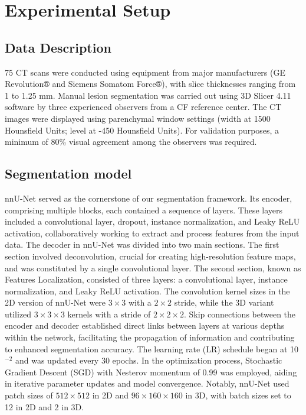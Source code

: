 \documentclass{article}
\begin{document}
\section{Experimental Setup}
\label{sec:met}
 
\subsection{Data Description}
\label{sssec:model}
75 CT scans were conducted using equipment from major manufacturers (GE Revolution® and Siemens Somatom Force®), with slice thicknesses ranging from 1 to 1.25 mm. Manual lesion segmentation was carried out using 3D Slicer 4.11 software by three experienced observers from a CF reference center. The CT images were displayed using parenchymal window settings (width at 1500 Hounsfield Units; level at -450 Hounsfield Units). For validation purposes, a minimum of 80\% visual agreement among the observers was required.

\subsection{Segmentation model}
\label{sec:model}
nnU-Net served as the cornerstone of our segmentation framework. Its encoder, comprising multiple blocks, each contained a sequence of layers. These layers included a convolutional layer, dropout, instance normalization, and Leaky ReLU activation, collaboratively working to extract and process features from the input data.
The decoder in nnU-Net was divided into two main sections. The first section involved deconvolution, crucial for creating high-resolution feature maps, and was constituted by a single convolutional layer. The second section, known as Features Localization, consisted of three layers: a convolutional layer, instance normalization, and Leaky ReLU activation. The convolution kernel sizes in the 2D version of nnU-Net were $3\times3$ with a $2\times2$ stride, while the 3D variant utilized $3\times3\times3$  kernels with a stride of $2\times 2\times2$.
Skip connections between the encoder and decoder established direct links between layers at various depths within the network, facilitating the propagation of information and contributing to enhanced segmentation accuracy. The learning rate (LR) schedule began at 10$^{-2}$ and was updated every 30 epochs. In the optimization process, Stochastic Gradient Descent (SGD) with Nesterov momentum of 0.99 was employed, aiding in iterative parameter updates and model convergence. Notably, nnU-Net used patch sizes of $512\times512$ in 2D and $96\times160\times160$ in 3D, with batch sizes set to 12 in 2D and 2 in 3D.
\end{document}
